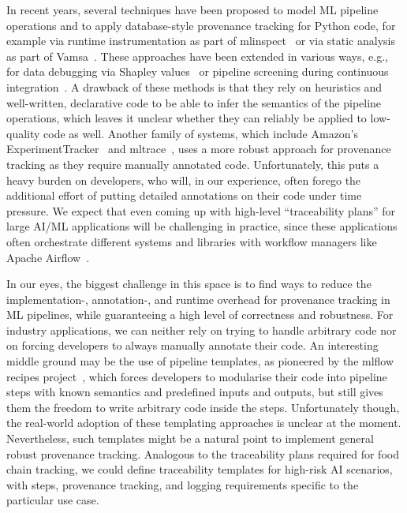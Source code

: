  In recent years, several techniques have been proposed to model ML pipeline operations and to apply database-style provenance tracking for Python code, for example via runtime instrumentation as part of mlinspect~\cite{grafberger2022data} or via static analysis as part of Vamsa~\cite{namaki2020vamsa}. These approaches have been extended in various ways, e.g., for data debugging via Shapley values~\cite{karlavs2022data} or pipeline screening during continuous integration~\cite{schelter2023proactively}. A drawback of these methods is that they rely on heuristics and well-written, declarative code to be able to infer the semantics of the pipeline operations, which leaves it unclear whether they can reliably be applied to low-quality code as well. Another family of systems, which include Amazon's ExperimentTracker~\cite{Schelter2017} and mltrace~\cite{shankar2022observability}, uses a more robust approach for provenance tracking as they require manually annotated code. Unfortunately, this puts a heavy burden on developers, who will, in our experience, often forego the additional effort of putting detailed annotations on their code under time pressure. We expect that even coming up with high-level ``traceability plans'' for large AI/ML applications will be challenging in practice, since these applications often orchestrate different systems and libraries with workflow managers like Apache Airflow~\cite{airflow}.

 In our eyes, the biggest challenge in this space is to find ways to reduce the implementation-, annotation-, and runtime overhead for provenance tracking in ML pipelines, while guaranteeing a high level of correctness and robustness. For industry applications, we can neither rely on trying to handle arbitrary code nor on forcing developers to always manually annotate their code. An interesting middle ground may be the use of pipeline templates, as pioneered by the mlflow recipes project~\cite{zaharia2018accelerating}, which forces developers to modularise their code into pipeline steps with known semantics and predefined inputs and outputs, but still gives them the freedom to write arbitrary code inside the steps. Unfortunately though, the real-world adoption of these templating approaches is unclear at the moment. Nevertheless, such templates might be a natural point to implement general robust provenance tracking. Analogous to the traceability plans required for food chain tracking, we could define traceability templates for high-risk AI scenarios, with steps, provenance tracking, and logging requirements specific to the particular use case. 

